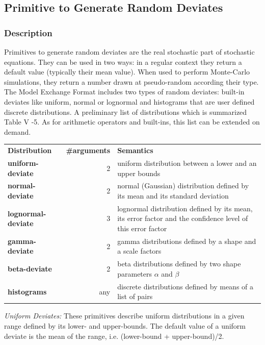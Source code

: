 \documentclass[11pt]{article}
\begin{document}
\subsection{Primitive to Generate Random Deviates}
\label{sec:orgc5833ee}


\subsubsection{Description}
\label{sec:org558cd25}

Primitives to generate random deviates are the real stochastic part of
stochastic equations. They can be used in two ways: in a regular context
they return a default value (typically their mean value). When used to
perform Monte-Carlo simulations, they return a number drawn at
pseudo-random according their type. The Model Exchange Format includes
two types of random deviates: built-in deviates like uniform, normal or
lognormal and histograms that are user defined discrete distributions. A
preliminary list of distributions which is summarized Table V -5. As for
arithmetic operators and built-ins, this list can be extended on demand.



\begin{center}
\begin{tabular}{lrl}
\textbf{Distribution} & \textbf{\#arguments} & \textbf{Semantics}\\
\textbf{uniform-deviate} & 2 & uniform distribution between a lower and an upper bounds\\
\textbf{normal-deviate} & 2 & normal (Gaussian) distribution defined by its mean and its standard deviation\\
\textbf{lognormal-deviate} & 3 & lognormal distribution defined by its mean, its error factor and the confidence level of this error factor\\
\textbf{gamma-deviate} & 2 & gamma distributions defined by a shape and a scale factors\\
\textbf{beta-deviate} & 2 & beta distributions defined by two shape parameters \(\alpha\) and \(\beta\)\\
\textbf{histograms} & any & discrete distributions defined by means of a list of pairs\\
\end{tabular}
\end{center}


\emph{Uniform Deviates:} These primitives describe uniform distributions in a
given range defined by its lower- and upper-bounds. The default value of
a uniform deviate is the mean of the range, i.e. (lower-bound +
upper-bound)/2.
\end{document}
